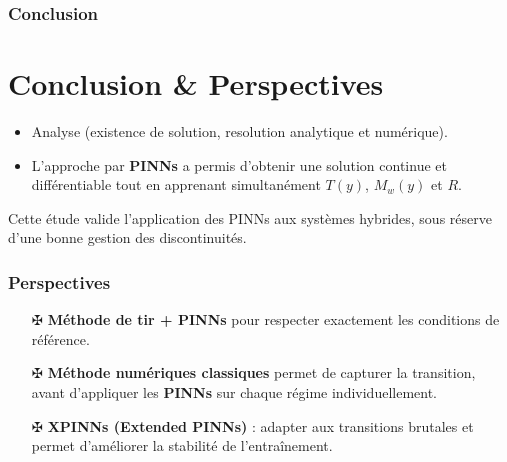 \documentclass[handout]{beamer}
\newtheorem{pbm et hypo}[thm]{Problématique et hypothèses}
\begin{document}
	\begin{frame}
		\frametitle{\textbf{Conclusion}}
		\section{Conclusion \& Perspectives}
		\begin{itemize}
			\item Analyse (existence de solution, resolution analytique et numérique).
				\vspace{0.3cm}
			\item L'approche par \textbf{PINNs} a permis d'obtenir une solution continue et différentiable tout en apprenant simultanément $T(y)$, $M_w(y)$ et $R$.
		\end{itemize}
	
		
		\pause
		\vspace{0.4cm}
		Cette étude valide l'application des PINNs aux systèmes hybrides, sous réserve d'une bonne gestion des discontinuités.
		
	\end{frame}
	
	\begin{frame}
		\frametitle{\textbf{Perspectives}}
		
		\begin{itemize}
			\item[$\maltese$] \textbf{Méthode de tir + PINNs} pour respecter exactement les conditions de référence. 
			\pause
			\vspace{0.4cm}
			\item[$ \maltese$]	\textbf{Méthode  numériques classiques} permet de capturer la transition, avant d'appliquer les \textbf{PINNs} sur chaque régime individuellement. \pause
			\vspace{0.4cm}
			\item[$\maltese$] \textbf{XPINNs (Extended PINNs)} : adapter aux transitions brutales et permet d'améliorer la stabilité de l'entraînement.
		\end{itemize}
	\end{frame}
	
\end{document}
